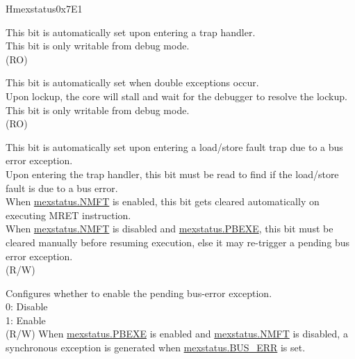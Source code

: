\begin{register}{H}{mexstatus}{0x7E1}\label{regdesc:MEXSTATUS}%
%
%
%
%
%
%
%
%
%
%
%
%
%
\regnewline%
\begin{regdesc}\begin{reglist}
\label{fielddesc:MEXSTATUS_EXPT_VLD}\item [EXPT\_VLD] This bit is automatically set upon entering a trap handler. \\
This bit is only writable from debug mode.\\
(RO)
\label{fielddesc:MEXSTATUS_LOCKUP}\item [LOCKUP] This bit is automatically set when double exceptions occur.\\
Upon lockup, the core will stall and wait for the debugger to resolve the lockup. \\
This bit is only writable from debug mode.\\
(RO)
\label{fielddesc:MEXSTATUS_BUS_ERR}\item [BUS\_ERR] This bit is automatically set upon entering a load/store fault trap due to a bus error exception. \\
Upon entering the trap handler, this bit must be read to find if the load/store fault is due to a bus error.\\
When \hyperref[fielddesc:MEXSTATUS_NMFT]{mexstatus.NMFT} is enabled, this bit gets cleared automatically on executing MRET instruction.\\ 
When \hyperref[fielddesc:MEXSTATUS_NMFT]{mexstatus.NMFT} is disabled and \hyperref[fielddesc:MEXSTATUS_PBEXE]{mexstatus.PBEXE}, this bit must be cleared manually before resuming execution, else it may re-trigger a pending bus error exception.\\
(R/W)
\label{fielddesc:MEXSTATUS_PBEXE}\item [PBEXE] Configures whether to enable the pending bus-error exception. \\
0: Disable\\
1: Enable \\
(R/W)
When \hyperref[fielddesc:MEXSTATUS_PBEXE]{mexstatus.PBEXE} is enabled and \hyperref[fielddesc:MEXSTATUS_NMFT]{mexstatus.NMFT} is disabled, a synchronous exception is generated when \hyperref[fielddesc:MEXSTATUS_BUS_ERR]{mexstatus.BUS\_ERR} is set.\\

\end{reglist}
\end{regdesc}
\end{register}
